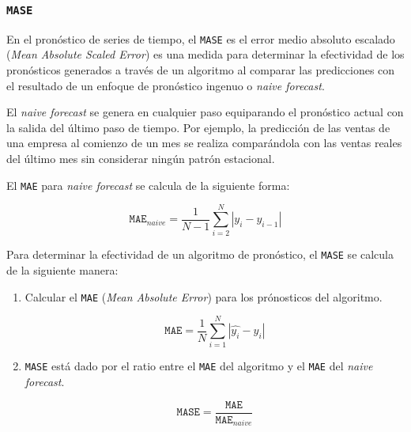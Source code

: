 \documentclass[a4paper,12pt]{article}
\begin{document}
\subsubsection{\texttt{MASE}}
En el pronóstico de series de tiempo, el \texttt{MASE} es el error medio absoluto escalado (\textit{Mean Absolute Scaled Error}) es una medida para determinar la efectividad de los pronósticos generados a través de un algoritmo al comparar las predicciones con el resultado de un enfoque de pronóstico ingenuo o \textit{naive forecast}. \citep{MASE}

El \textit{naive forecast} se genera en cualquier paso equiparando el pronóstico actual con la salida del último paso de tiempo. Por ejemplo, la predicción de las ventas de una empresa al comienzo de un mes se realiza comparándola con las ventas reales del último mes sin considerar ningún patrón estacional.

El \texttt{MAE} para \textit{naive forecast} se calcula de la siguiente forma:

$$
\texttt{MAE}_{naive} = \frac{1}{N-1} \sum_{i=2}^N |y_i - y_{i-1}|
$$

Para determinar la efectividad de un algoritmo de pronóstico, el \texttt{MASE} se calcula de la siguiente manera:

\begin{enumerate}
	\item Calcular el \texttt{MAE} (\textit{Mean Absolute Error}) para los prónosticos del algoritmo.
	
	$$
	\texttt{MAE} = \frac{1}{N} \sum_{i=1}^N |\hat{y_i} - y_i|	
	$$	
	\item \texttt{MASE} está dado por el ratio entre el \texttt{MAE} del algoritmo y el \texttt{MAE} del \textit{naive forecast}.
	
	$$
	\texttt{MASE} = \frac{\texttt{MAE}}{\texttt{MAE}_{naive}}	
	$$
	
\end{enumerate}
\end{document}
